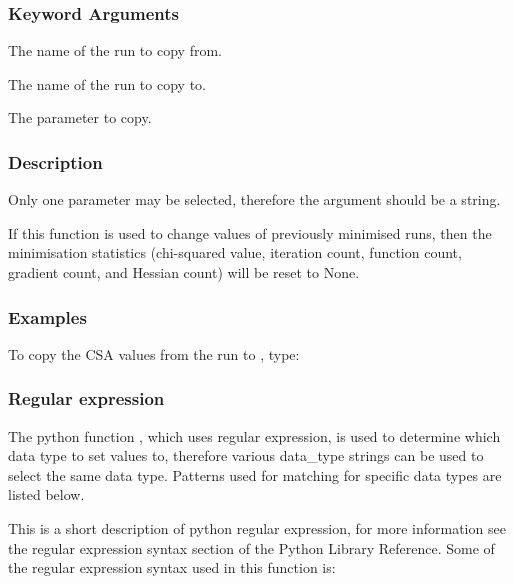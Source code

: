 \subsubsection{Keyword Arguments}

  The name of the run to copy from. 

  The name of the run to copy to. 

  The parameter to copy. 




\subsubsection{Description}

Only one parameter may be selected, therefore the  argument should be a string.


If this function is used to change values of previously minimised runs, then the minimisation statistics (chi-squared value, iteration count, function count, gradient count, and Hessian count) will be reset to None.



\subsubsection{Examples}

To copy the CSA values from the run  to , type:




\subsubsection{Regular expression}

The python function , which uses regular expression, is used to determine which data type to set values to, therefore various data\_type strings can be used to select the same data type.  Patterns used for matching for specific data types are listed below.


This is a short description of python regular expression, for more information see the regular expression syntax section of the Python Library Reference.  Some of the regular expression syntax used in this function is:


